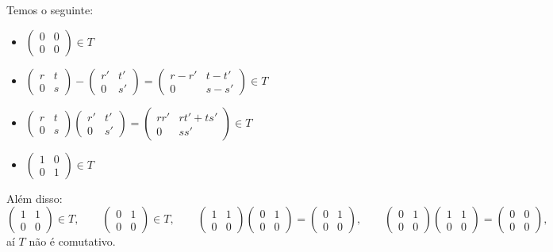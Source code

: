 \documentclass[10pt,a4paper]{article}
\begin{document}
\medskip
\noindent
Temos o seguinte:
\begin{itemize}
\item $\begin{pmatrix}
0&0\\0&0
\end{pmatrix}\in T$
\item $\begin{pmatrix}
r&t\\0&s
\end{pmatrix}-\begin{pmatrix}
r'&t'\\0&s'
\end{pmatrix}=\begin{pmatrix}
r-r'&t-t'\\0&s-s'
\end{pmatrix}\in T$
\item $\begin{pmatrix}
r&t\\0&s
\end{pmatrix}\begin{pmatrix}
r'&t'\\0&s'
\end{pmatrix}=\begin{pmatrix}
rr'&rt'+ts'\\0&ss'
\end{pmatrix}\in T$
\item $\begin{pmatrix}
1&0\\0&1
\end{pmatrix}\in T$
\end{itemize}
Além disso:
\[
\begin{pmatrix}
1&1\\0&0
\end{pmatrix}\in T,\quad\quad\begin{pmatrix}
0&1\\0&0
\end{pmatrix}\in T,\quad\quad\begin{pmatrix}
1&1\\0&0
\end{pmatrix}\begin{pmatrix}
0&1\\0&0
\end{pmatrix}=\begin{pmatrix}
0&1\\0&0
\end{pmatrix},\quad\quad\begin{pmatrix}
0&1\\0&0
\end{pmatrix}\begin{pmatrix}
1&1\\0&0
\end{pmatrix}=\begin{pmatrix}
0&0\\0&0
\end{pmatrix},
\]
aí $T$ não é comutativo.
\end{document}
